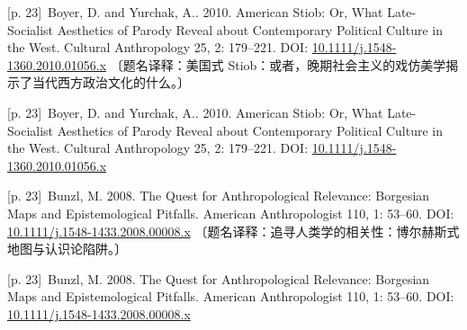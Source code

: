 \documentclass[10pt,a4paper]{article}
\begin{document}
\noindent\begin{minipage}{\textwidth}\begin{minipage}[t]{\dimexpr.5\textwidth-4mm\relax}\noindent\begin{minipage}[t]{\linewidth}{\scriptsize\color{gray} [p. 23]}\ Boyer, D. and Yurchak, A.. 2010. American Stiob: Or, What Late-Socialist Aesthetics of Parody Reveal about Contemporary Political Culture in the West. Cultural Anthropology 25, 2: 179–221. DOI: \url{10.1111/j.1548-1360.2010.01056.x} 〔题名译释：美国式 Stiob：或者，晚期社会主义的戏仿美学揭示了当代西方政治文化的什么。〕\par\end{minipage}\par\end{minipage}\hfill\begin{minipage}[t]{\dimexpr.5\textwidth-4mm\relax}\noindent\begin{minipage}[t]{\linewidth}{\scriptsize\color{gray} [p. 23]}\ Boyer, D. and Yurchak, A.. 2010. American Stiob: Or, What Late-Socialist Aesthetics of Parody Reveal about Contemporary Political Culture in the West. Cultural Anthropology 25, 2: 179–221. DOI: \url{10.1111/j.1548-1360.2010.01056.x}\par\end{minipage}\par\end{minipage}\end{minipage}\par
\noindent\begin{minipage}{\textwidth}\begin{minipage}[t]{\dimexpr.5\textwidth-4mm\relax}\noindent\begin{minipage}[t]{\linewidth}{\scriptsize\color{gray} [p. 23]}\ Bunzl, M. 2008. The Quest for Anthropological Relevance: Borgesian Maps and Epistemological Pitfalls. American Anthropologist 110, 1: 53–60. DOI: \url{10.1111/j.1548-1433.2008.00008.x} 〔题名译释：追寻人类学的相关性：博尔赫斯式地图与认识论陷阱。〕\par\end{minipage}\par\end{minipage}\hfill\begin{minipage}[t]{\dimexpr.5\textwidth-4mm\relax}\noindent\begin{minipage}[t]{\linewidth}{\scriptsize\color{gray} [p. 23]}\ Bunzl, M. 2008. The Quest for Anthropological Relevance: Borgesian Maps and Epistemological Pitfalls. American Anthropologist 110, 1: 53–60. DOI: \url{10.1111/j.1548-1433.2008.00008.x}\par\end{minipage}\par\end{minipage}\end{minipage}\par
\end{document}
